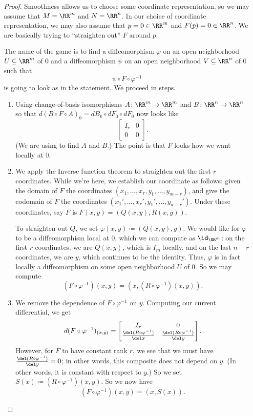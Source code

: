 \documentclass[../notes.tex]{subfiles}
\begin{document}
\begin{proof}
	Smoothness allows us to choose some coordinate representation, so we may assume that $M=\RR^m$ and $N=\RR^n$. In our choice of coordinate representation, we may also assume that $p=0\in\RR^m$ and $F(p)=0\in\RR^n$. We are basically trying to ``straighten out'' $F$ around $p$.

	The name of the game is to find a diffeomorphism $\varphi$ on an open neighborhood $U\subseteq\RR^m$ of $0$ and a diffeomorphism $\psi$ on an open neighborhood $V\subseteq\RR^n$ of $0$ such that
	\[\psi\circ F\circ\varphi^{-1}\]
	is going to look as in the statement. We proceed in steps.
	\begin{enumerate}
		\item Using change-of-basis isomorphisms $A\colon\RR^m\to\RR^m$ and $B\colon\RR^n\to\RR^n$ so that $d(B\circ F\circ A)_0=dB_0\circ dF_0\circ dF_0$ now looks like
		\[\begin{bmatrix}
			I_r & 0 \\
			0 & 0
		\end{bmatrix}.\]
		(We are using  to find $A$ and $B$.) The point is that $F$ looks how we want locally at $0$.

		\item We apply the Inverse function theorem to straighten out the first $r$ coordinates. While we're here, we establish our coordinate as follows: given the domain of $F$ the coordinates $(x_1,\ldots,x_r,y_1,\ldots,y_{m-r})$, and give the codomain of $F$ the coordinates $(x_1',\ldots,x_r',y_1',\ldots,y_{n-r}')$. Under these coordinates, say $F$ is $F(x,y)=(Q(x,y),R(x,y))$.

		To straighten out $Q$, we set $\varphi(x,y)\coloneqq(Q(x,y),y)$. We would like for $\varphi$ to be a diffeomorphism local at $0$, which we can compute as $\id_{\RR^m}$: on the first $r$ coordinates, we are $Q(x,y)$, which is $I_m$ locally, and on the last $n-r$ coordinates, we are $y$, which continues to be the identity. Thus, $\varphi$ is in fact locally a diffeomorphism on some open neighborhood $U$ of $0$. So we may compute
		\[\left(F\circ\varphi^{-1}\right)(x,y)=\left(x,(R\circ\varphi^{-1})(x,y)\right).\]

		\item We remove the dependence of $F\circ\varphi^{-1}$ on $y$. Computing our current differential, we get
		\[d(F\circ\varphi^{-1})_{(x,y)}=\begin{bmatrix}
			I_r & 0 \\
			\frac{\del (R\circ\varphi^{-1})}{\del x} & \frac{\del (R\circ\varphi^{-1})}{\del y}
		\end{bmatrix}.\]
		However, for $F$ to have constant rank $r$, we see that we must have $\frac{\del (R\circ\varphi^{-1})}{\del y}=0$; in other words, this composite does not depend on $y$. (In other words, it is constant with respect to $y$.) So we set $S(x)\coloneqq(R\circ\varphi^{-1})(x,y)$. So we now have
		\[\left(F\circ\varphi^{-1}\right)(x,y)=(x,S(x)).\]


\end{enumerate}
\end{proof}
\end{document}

